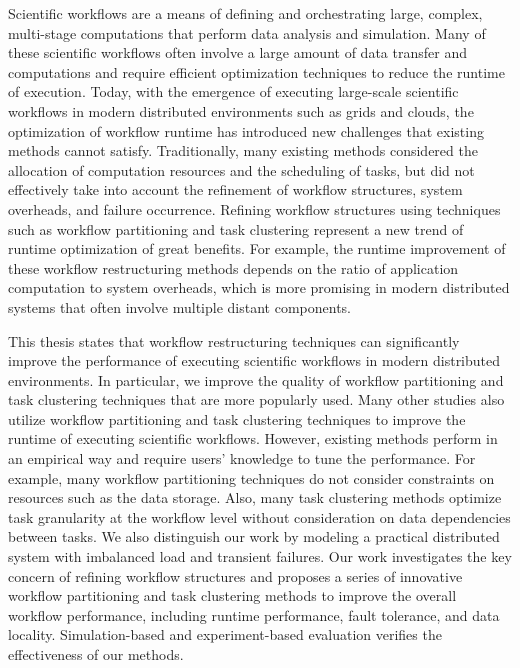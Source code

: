Scientific workflows are a means of defining and orchestrating large, complex, multi-stage computations that perform data analysis and simulation. 
Many of these scientific workflows often involve a large amount of data transfer and computations and require efficient optimization techniques to reduce the runtime of execution. 
Today, with the emergence of executing large-scale scientific workflows in modern distributed environments such as grids and clouds, the optimization of workflow runtime has introduced new challenges that existing methods cannot satisfy. Traditionally, many existing methods considered the allocation of computation resources and the scheduling of tasks, but did not effectively take into account the refinement of workflow structures, system overheads, and failure occurrence. Refining workflow structures using techniques such as workflow partitioning and task clustering represent a new trend of runtime optimization of great benefits. 
For example, the runtime improvement of these workflow restructuring methods depends on the ratio of application computation to system overheads, which is more promising in modern distributed systems that often involve multiple distant components. 

This thesis states that workflow restructuring techniques can significantly improve the performance of executing scientific workflows in modern distributed environments. In particular, we improve the quality of workflow partitioning and task clustering techniques that are more popularly used. Many other studies also utilize workflow partitioning and task clustering techniques to improve the runtime of executing scientific workflows. However, existing methods perform in an empirical way and require users' knowledge to tune the performance. For example, many workflow partitioning techniques do not consider constraints on resources such as the data storage. Also, many task clustering methods optimize task granularity at the workflow level without consideration on data dependencies between tasks. We also distinguish our work by modeling a practical distributed system with imbalanced load and transient failures. 
Our work investigates the key concern of refining workflow structures and proposes a series of innovative workflow partitioning and task clustering methods to improve the overall workflow performance, including runtime performance, fault tolerance, and data locality. Simulation-based and experiment-based evaluation verifies the effectiveness of our methods. 


